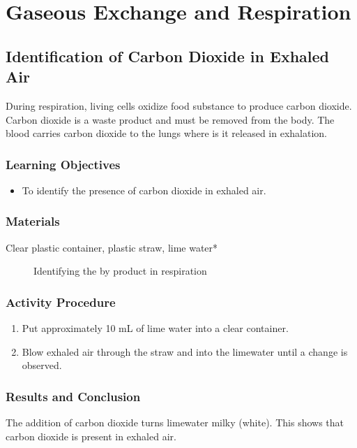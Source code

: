 \section{Gaseous Exchange and Respiration}

\subsection{Identification of Carbon Dioxide in Exhaled Air}

During respiration, living cells oxidize food substance to produce carbon dioxide. Carbon dioxide is a waste product and must be removed from the body. The blood carries carbon dioxide to the lungs where is it released in exhalation.

\subsubsection*{Learning Objectives}
\begin{itemize}
\item{To identify the presence of carbon dioxide in exhaled air.}
\end{itemize}

\subsubsection*{Materials}
Clear plastic container, plastic straw, lime water*

\begin{figure}
\begin{center}
\def\svgwidth{2cm}

\caption{Identifying the by product  in respiration}
\label{fig:CO2-limewater}
\end{center}
\end{figure}

\subsubsection*{Activity Procedure}
\begin{enumerate}
\item{Put approximately 10 mL of lime water into a clear container.}
\item{Blow exhaled air through the straw and into the limewater until a change is observed.}
\end{enumerate}

\subsubsection*{Results and Conclusion}
The addition of carbon dioxide turns limewater milky (white). This shows that carbon dioxide is present in exhaled air.

